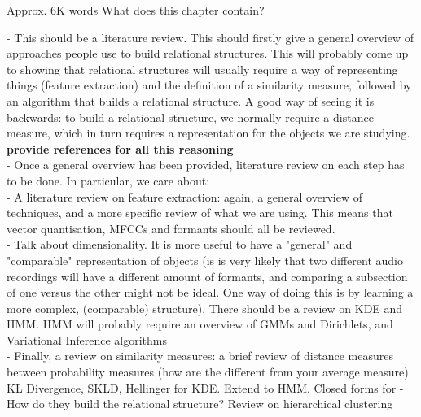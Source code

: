 \documentclass[../main.tex]{subfiles}
\begin{document}
Approx. 6K words
What does this chapter contain?

- This should be a literature review. This should firstly give a general overview of approaches people use to build relational structures. This will probably come up to showing that relational structures will usually require a way of representing things (feature extraction) and the definition of a similarity measure, followed by an algorithm that builds a relational structure. A good way of seeing it is backwards: to build a relational structure, we normally require a distance measure, which in turn requires a representation for the objects we are studying. \textbf{provide references for all this reasoning}\\
- Once a general overview has been provided, literature review on each step has to be done. In particular, we care about:\\
- A literature review on feature extraction: again, a general overview of techniques, and a more specific review of what we are using. This means that vector quantisation, MFCCs and formants should all be reviewed.\\
- Talk about dimensionality. It is more useful to have a "general" and "comparable" representation of objects (is is very likely that two different audio recordings will have a different amount of formants, and comparing a subsection of one versus the other might not be ideal. One way of doing this is by learning a more complex, (comparable) structure). There should be a review on KDE and HMM. HMM will probably require an overview of GMMs and Dirichlets, and Variational Inference algorithms\\
- Finally, a review on similarity measures: a brief review of distance measures between probability measures (how are the different from your average measure). KL Divergence, SKLD, Hellinger for KDE. Extend to HMM. Closed forms for 
- How do they build the relational structure? Review on hierarchical clustering
\end{document}
